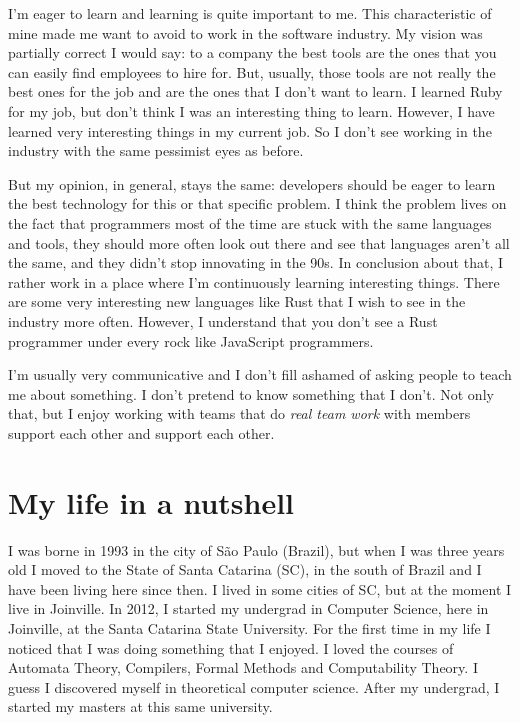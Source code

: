 \documentclass[11pt,a4paper,sans]{moderncv}
\begin{document}
\medskip

I'm eager to learn and learning is quite important to me.
This characteristic of mine made me want to avoid to work in the software industry.
My vision was partially correct I would say:
to a company the best tools are the ones that you can easily find employees to hire for.
But, usually, those tools are not really the best ones for the job and are the ones that I don't want to learn.
I learned Ruby for my job, but don't think I was an interesting thing to learn.
However, I have learned very interesting things in my current job.
So I don't see working in the industry with the same pessimist eyes as before.

\medskip

But my opinion, in general, stays the same: developers should be eager to learn the best technology for this or that specific problem.
I think the problem lives on the fact that programmers most of the time are stuck with the same languages and tools, they should more often look out there and see that languages aren't all the same, and they didn't stop innovating in the 90s.
In conclusion about that, I rather work in a place where I'm continuously learning interesting things.
There are some very interesting new languages like Rust that I wish to see in the industry more often.
However, I understand that you don't see a Rust programmer under every rock like JavaScript programmers.

\medskip

I'm usually very communicative and I don't fill ashamed of asking people to teach me about something.
I don't pretend to know something that I don't.
Not only that, but I enjoy working with teams that do \textit{real team work} with members support each other and support each other.

\section{My life in a nutshell}
I was borne in 1993 in the city of São Paulo (Brazil), but when I was three years old I moved to the State of Santa Catarina (SC), in the south of Brazil and I have been living here since then.
I lived in some cities of SC, but at the moment I live in Joinville.
In 2012, I started my undergrad in Computer Science, here in Joinville, at the Santa Catarina State University.
For the first time in my life I noticed that I was doing something that I enjoyed.
I loved the courses of Automata Theory, Compilers, Formal Methods and Computability Theory.
I guess I discovered myself in theoretical computer science.
After my undergrad, I started my masters at this same university.
\end{document}
